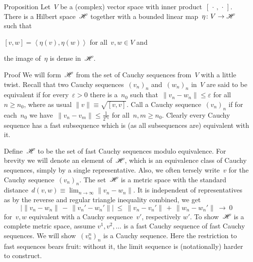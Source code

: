 \documentclass[b]{subfiles}
\begin{document}
\begin{parsec}
\begin{point}{Proposition}%
    Let~$V$ be a (complex) vector space with inner
        product~$[\,\cdot\,,\,\cdot\,]$.
    There is a Hilbert space~$\mathscr{H}$
        together with a bounded linear map~$\eta\colon V \to \mathscr{H}$
            such that
        \begin{inparaenum}
        \item
        $[v,w] = \left<\eta(v), \eta(w)\right>$
            for all~$v,w \in V$ and
        \item
        the image of~$\eta$ is dense in~$\mathscr{H}$.
        \end{inparaenum}
\begin{point}{Proof}%
We will form~$\mathscr{H}$ from the set of Cauchy sequences from~$V$
    with a little twist.
Recall that two Cauchy
    sequences~$(v_n)_n$ and~$(w_n)_n$ in~$V$
    are said to be equivalent
    if for every~$\varepsilon > 0$
    there is a~$n_0$
    such that~$\| v_n - w_n \| \leq \varepsilon$
    for all~$n \geq n_0$,
    where as usual $\|v\| \equiv \sqrt{[v,v]}$.
Call a Cauchy sequence~$(v_n)_n$ 
    if for each~$n_0$
    we have~$\| v_n - v_m\| \leq \frac{1}{2^{n_0}}$
    for all~$n,m \geq n_0$.
Clearly every Cauchy sequence has a fast subsequence
    which is (as all subsequences are) equivalent with it.
\begin{point}%
    Define~$\mathscr{H}$ to be the set of fast Cauchy sequences modulo
        equivalence.
For brevity we will denote an element of~$\mathscr{H}$,
    which is an equivalence class of Cauchy sequences, simply by
    a single representative.
Also, we often tersely write~$v$ for the Cauchy sequence~$(v_n)_n$.
The set~$\mathscr{H}$ is a metric space
    with the standard
    distance~$d(v, w) \equiv \lim_{n\to\infty} \| v_n - w_n\|$.
It is independent of representatives
    as by the reverse and regular triangle inequality combined,
     we get
\begin{equation*}
    \bigl| \| v_n - w_n \| \,-\, \| v_n' - w_n' \| \bigr|
        \ \leq \ 
    \| v_n - v_n' \| \,+\, \|w_n - w_n'\| \ \rightarrow \ 0
\end{equation*}
for~$v,w$ equivalent with a Cauchy sequence~$v'$, respectively $w'$.
To show~$\mathscr{H}$ is a complete metric space, assume
$v^1, v^2, \ldots$
is a fast Cauchy sequence of fast Cauchy sequences.
We will show~$(v_n^n)_n$ is a Cauchy sequence.
Here the restriction to fast sequences bears fruit:
without it, the limit sequence is (notationally) harder to construct.

\end{point}
\end{point}
\end{point}
\end{parsec}
\end{document}
